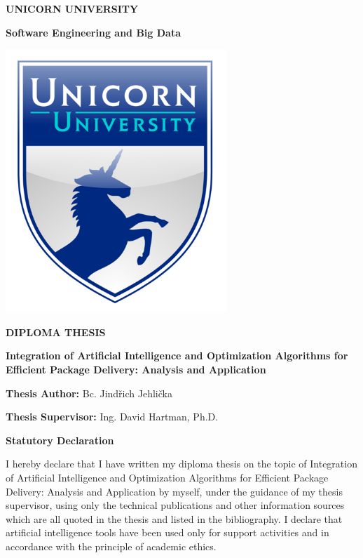 \documentclass{article}
\author{}
\date{}
\begin{document}
    \pagebreak

    \thispagestyle{empty}

    \begin{center}
        \textbf{UNICORN UNIVERSITY}

        \textbf{Software Engineering and Big Data}

        \includegraphics[width=3.27778in,height=3.90671in]{logo.png}

        \textbf{DIPLOMA THESIS}

        \textbf{Integration of Artificial Intelligence and Optimization Algorithms for Efficient Package Delivery: Analysis and Application}
    \end{center}

    \vfill

    \begin{flushleft}
        \textbf{Thesis Author:} Bc. Jindřich Jehlička

        \textbf{Thesis Supervisor:} Ing. David Hartman, Ph.D.
    \end{flushleft}

    \newpage
    \thispagestyle{empty}


    \textbf{Statutory Declaration}


    I hereby declare that I have written my diploma thesis on the topic of Integration of Artificial Intelligence and Optimization Algorithms for Efficient Package Delivery: Analysis and Application by myself, under the guidance of my thesis supervisor, using only the technical publications and other information sources which are all quoted in the thesis and listed in the bibliography. I declare that artificial intelligence tools have been used only for support activities and in accordance with the principle of academic ethics.
\end{document}
